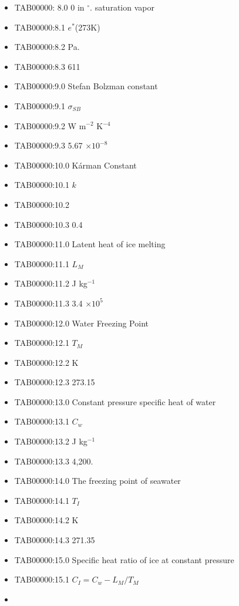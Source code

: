 \begin{itemize}
  \begin{enumerate}
  \def\labelenumi{\arabic{enumi}.}
  \setcounter{enumi}{999}
  \tightlist
  \item
  \end{enumerate}
\item
  TAB00000: 8.0 0 in \(^{\circ}\). saturation vapor
\item
  TAB00000:8.1 \(e^*\)(273K)
\item
  TAB00000:8.2 Pa.
\item
  TAB00000:8.3 611
\item
  TAB00000:9.0 Stefan Bolzman constant
\item
  TAB00000:9.1 \(\sigma_{SB}\)
\item
  TAB00000:9.2 W m\(^{-2}\) K\(^{-4}\)
\item
  TAB00000:9.3 5.67 \(\times 10^{-8}\)
\item
  TAB00000:10.0 Kárman Constant
\item
  TAB00000:10.1 \(k\)
\item
  TAB00000:10.2
\item
  TAB00000:10.3 0.4
\item
  TAB00000:11.0 Latent heat of ice melting
\item
  TAB00000:11.1 \(L_M\)
\item
  TAB00000:11.2 J kg\(^{-1}\)
\item
  TAB00000:11.3 3.4 \(\times 10^5\)
\item
  TAB00000:12.0 Water Freezing Point
\item
  TAB00000:12.1 \(T_M\)
\item
  TAB00000:12.2 K
\item
  TAB00000:12.3 273.15
\item
  TAB00000:13.0 Constant pressure specific heat of water
\item
  TAB00000:13.1 \(C_w\)
\item
  TAB00000:13.2 J kg\(^{-1}\)
\item
  TAB00000:13.3 4,200.
\item
  TAB00000:14.0 The freezing point of seawater
\item
  TAB00000:14.1 \(T_I\)
\item
  TAB00000:14.2 K
\item
  TAB00000:14.3 271.35
\item
  TAB00000:15.0 Specific heat ratio of ice at constant pressure
\item
  TAB00000:15.1 \(C_I = C_w - L_M/T_M\)
\item

\end{itemize}

